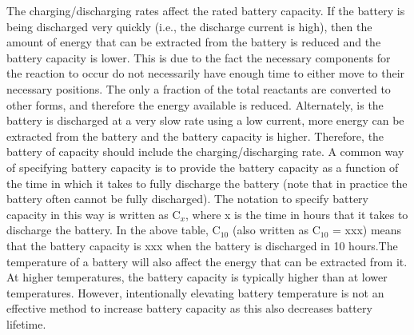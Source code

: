 The charging/discharging rates affect the rated battery capacity. If the battery is being discharged very quickly (i.e., the discharge current is high), then the amount of energy that can be extracted from the battery is reduced and the battery capacity is lower. This is due to the fact the necessary components for the reaction to occur do not necessarily have enough time to either move to their necessary positions. The only a fraction of the total reactants are converted to other forms, and therefore the energy available is reduced. Alternately, is the battery is discharged at a very slow rate using a low current, more energy can be extracted from the battery and the battery capacity is higher. Therefore, the battery of capacity should include the charging/discharging rate. A common way of specifying battery capacity is to provide the battery capacity as a function of the time in which it takes to fully discharge the battery (note that in practice the battery often cannot be fully discharged). The notation to specify battery capacity in this way is written as C$_x$, where x is the time in hours that it takes to discharge the battery. In the above table, C$_{10}$ (also written as C$_{10}$ = xxx) means that the battery capacity is xxx when the battery is discharged in 10 hours.The temperature of a battery will also affect the energy that can be extracted from it. At higher temperatures, the battery capacity is typically higher than at lower temperatures. However, intentionally elevating battery temperature is not an effective method to increase battery capacity as this also decreases battery lifetime. 
